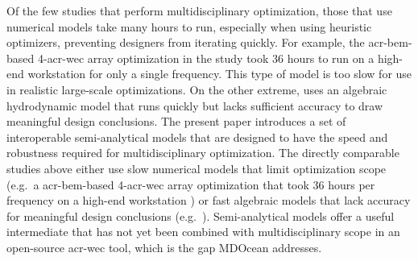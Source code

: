     Of the few studies that perform multidisciplinary optimization, those that use numerical models take many hours to run, especially when using heuristic optimizers, preventing designers from iterating quickly.
    For example, the \gls{acr-bem}-based 4-\gls{acr-wec} array optimization in the study \citep{khanal_multi-objective_2024} took 36 hours to run on a high-end workstation for only a single frequency.
    This type of model is too slow for use in realistic large-scale optimizations.
    On the other extreme, \citet{mccabe_multidisciplinary_2022} uses an algebraic hydrodynamic model that runs quickly but lacks sufficient accuracy to draw meaningful design conclusions.
    The present paper introduces a set of interoperable semi-analytical models that are designed to have the speed and robustness required for multidisciplinary optimization.
\else
    The directly comparable studies above either use slow numerical models that limit optimization scope (e.g.\ a \gls{acr-bem}-based 4-\gls{acr-wec} array optimization that took 36 hours per frequency on a high-end workstation \citep{khanal_multi-objective_2024}) or fast algebraic models that lack accuracy for meaningful design conclusions (e.g.\ \citep{mccabe_multidisciplinary_2022}).
    Semi-analytical models offer a useful intermediate that has not yet been combined with multidisciplinary scope in an open-source \gls{acr-wec} tool, which is the gap MDOcean addresses.
\fi

